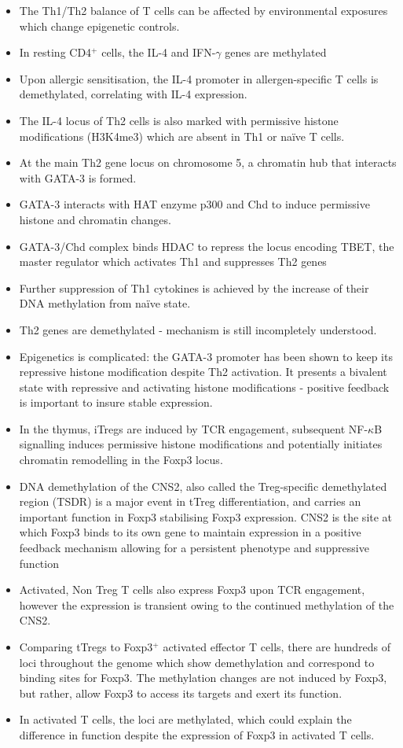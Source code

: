 \documentclass[12pt]{article}
\newcommand{\CDH}{CD4$^+$ } %
\newcommand{\IFNG}{IFN-$\gamma$ }
\newcommand{\NFKB}{NF-$\kappa$B }
\begin{document}
				\begin{itemize}
					\item The Th1/Th2 balance of T cells can be affected by environmental exposures which change epigenetic controls.
					\item In resting \CDH cells, the IL-4 and \IFNG genes are methylated 
					\item Upon allergic sensitisation, the IL-4 promoter in allergen-specific T cells is demethylated, correlating with IL-4 expression.
					\item The IL-4 locus of Th2 cells is also marked with permissive histone modifications (H3K4me3) which are absent in Th1 or na\"{i}ve T cells.
					\item At the main Th2 gene locus on chromosome 5, a chromatin hub that interacts with GATA-3 is formed.
					\item GATA-3 interacts with HAT enzyme p300 and Chd to induce permissive histone and chromatin changes.
					\item GATA-3/Chd complex binds HDAC to repress the locus encoding TBET, the master regulator which activates Th1 and suppresses Th2 genes
					\item Further suppression of Th1 cytokines is achieved by the increase of their DNA methylation from na\"{i}ve state. 
					\item Th2 genes are demethylated - mechanism is still incompletely understood.
					\item Epigenetics is complicated: the GATA-3 promoter has been shown to keep its repressive histone modification despite Th2 activation. It presents a bivalent state with repressive and activating histone modifications - positive feedback is important to insure stable expression.
					\item In the thymus, iTregs are induced by TCR engagement, subsequent \NFKB signalling induces permissive histone modifications and potentially initiates chromatin remodelling in the Foxp3 locus.
					\item DNA demethylation of the CNS2, also called the Treg-specific demethylated region (TSDR) is a major event in tTreg differentiation, and carries an important function in Foxp3 stabilising Foxp3 expression. CNS2 is the site at which Foxp3 binds to its own gene to maintain expression in a positive feedback mechanism allowing for a persistent phenotype and suppressive function
					\item Activated, Non Treg T cells also express Foxp3 upon TCR engagement, however the expression is transient owing to the continued methylation of the CNS2. 
					\item Comparing tTregs to Foxp3$^+$ activated effector T cells, there are hundreds of loci throughout the genome which show demethylation and correspond to binding sites for Foxp3. The methylation changes are not induced by Foxp3, but rather, allow Foxp3 to access its targets and exert its function. 
					\item In activated T cells, the loci are methylated, which could explain the difference in function despite the expression of Foxp3 in activated T cells.
				\end{itemize}
			
\end{document}
